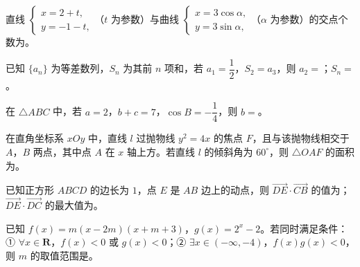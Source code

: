 \begin{question}
直线 $\begin{cases}x=2+t,\\y=-1-t,\end{cases}$（$t$ 为参数）与曲线 $\begin{cases}x=3\cos\alpha,\\y=3\sin\alpha,\end{cases}$（$\alpha$ 为参数）的交点个数为\gkblank{}。

\end{question}
\begin{question}
已知 $\{a_n\}$ 为等差数列，$S_n$ 为其前 $n$ 项和，若 $a_1=\dfrac12$，$S_2=a_3$，则 $a_2=$\gkblank{}；$S_n=$\gkblank{}。

\end{question}
\begin{question}
在 $\triangle ABC$ 中，若 $a=2$，$b+c=7$，$\cos B=-\dfrac14$，则 $b=$\gkblank{}。

\end{question}
\begin{question}
在直角坐标系 $xOy$ 中，直线 $l$ 过抛物线 $y^2=4x$ 的焦点 $F$，且与该抛物线相交于 $A$，$B$ 两点，其中点 $A$ 在 $x$ 轴上方。若直线 $l$ 的倾斜角为 $60^\circ$，则 $\triangle OAF$ 的面积为\gkblank{}。

\end{question}
\begin{question}
已知正方形 $ABCD$ 的边长为 $1$，点 $E$ 是 $AB$ 边上的动点，则 $\overrightarrow{DE}\cdot\overrightarrow{CB}$ 的值为\gkblank{}；$\overrightarrow{DE}\cdot\overrightarrow{DC}$ 的最大值为\gkblank{}。

\end{question}
\begin{question}
已知 $f(x)=m(x-2m)(x+m+3)$，$g(x)=2^x-2$。若同时满足条件：① $\forall x\in\mathbf R$，$f(x)<0$ 或 $g(x)<0$；② $\exists x\in(-\infty,-4)$，$f(x)g(x)<0$，则 $m$ 的取值范围是\gkblank{}。

\end{question}

